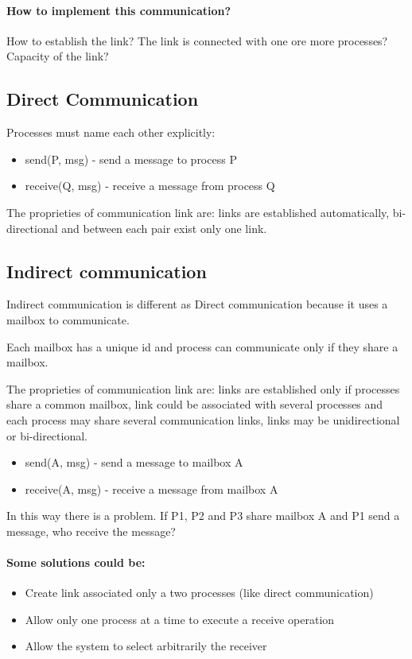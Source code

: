 \paragraph{How to implement this communication?} How to establish the link? The link is connected with one ore more processes? Capacity of the link? 

\subsection{Direct Communication}
Processes must name each other explicitly:

\begin{itemize}
    \item send(P, msg) - send a message to process P
    \item receive(Q, msg) - receive a message from process Q
\end{itemize}

The proprieties of communication link are: links are established automatically, bi-directional and between each pair exist only one link.

\subsection{Indirect communication}

Indirect communication is different as Direct communication because it uses a mailbox to communicate.


Each mailbox has a unique id and process can communicate only if they share a mailbox.

The proprieties of communication link are: links are established only if processes share a common mailbox, link could be associated with several processes and each process may share several communication links, links may be unidirectional or bi-directional.

\begin{itemize}
    \item send(A, msg) - send a message to mailbox A
    \item receive(A, msg) - receive a message from mailbox A
\end{itemize}

In this way there is a problem. If P1, P2 and P3 share mailbox A and P1 send a message, who receive the message?

\paragraph{Some solutions could be:}
\begin{itemize}
    \item Create link associated only a two processes (like direct communication)
    \item  Allow only one process at a time to execute a receive operation
    \item Allow the system to select arbitrarily the receiver
\end{itemize}

